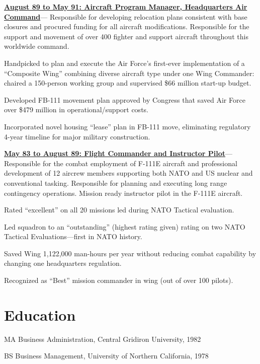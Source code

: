 \documentclass[9pt,letterpaper]{scrartcl}
\newenvironment{accomplishments}{%
	\begin{list}{\textbullet}{%
        \setlength\leftmargin{1em}      %
        \setlength\topsep{0ex}          %
        \setlength\parskip{0.5ex}
        \setstretch{0.8}
        \setlength\listparindent{1em}   %
        \setlength\parsep{0in}          %
        \setlength\itemsep{0.5ex}         %
        }
}{
	\end{list}
}
\newcommand{\accomplishment}{\item }
\newenvironment{job}[4]{%
\vspace{0.0em}
\noindent\textbf{\underline{{#1: #2\ifthenelse{\isempty{#3}}{}{, #3}}}}---#4%
\noindent\begin{accomplishments}{}
}{
\end{accomplishments}
\vspace{1.5em}
}
\newenvironment{degree}[4]{%
\par\noindent#1, #3, #2
}{
\vspace{0.0ex}
}
\begin{document}
\begin{job}{August 89 to May 91}{Aircraft Program Manager, Headquarters Air Command}{}{%
Responsible for developing relocation plans
consistent with base closures and procured funding for all aircraft modifications. Responsible for the support and movement of over
400 fighter and support aircraft throughout this worldwide command.
}
\accomplishment Handpicked to plan and execute the Air Force's first-ever implementation of a ``Composite Wing'' combining diverse aircraft type
under one Wing Commander: chaired a 150-person working group and supervised \$66 million start-up budget.
\accomplishment Developed FB-111 movement plan approved by Congress that saved Air Force over \$479 million in operational/support costs.
\accomplishment Incorporated novel housing ``lease'' plan in FB-111 move, eliminating regulatory 4-year timeline for major military construction.
\end{job}

\begin{job}{May 83 to August 89}{Flight Commander and Instructor Pilot}{}{%
Responsible for the combat employment of F-111E aircraft and
professional development of 12 aircrew members supporting both NATO and US nuclear and conventional tasking. Responsible for
planning and executing long range contingency operations. Mission ready instructor pilot in the F-111E aircraft.
}
\accomplishment Rated ``excellent'' on all 20 missions led during NATO Tactical evaluation.
\accomplishment Led squadron to an ``outstanding'' (highest rating given) rating on two NATO Tactical Evaluations---first in NATO history.
\accomplishment Saved Wing 1,122,000 man-hours per year without reducing combat capability by changing one headquarters regulation.
\accomplishment Recognized as ``Best'' mission commander in wing (out of over 100 pilots).
\end{job}


\section*{Education}

\begin{degree}{MA Business Administration}{1982}{Central Gridiron University}{Seol, South Korea}\end{degree}
\begin{degree}{BS Business Management}{1978}{University of Northern California}{Santa Rosa, CA}\end{degree}
\end{document}
